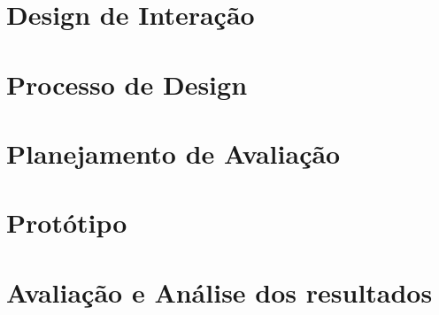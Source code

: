 









\frenchspacing 
\imprimircapa
\imprimirfolhaderosto*





\textual




\part[Design de Interação]{Design de Interação}




\part[Processo de Design]{Processo de Design}



\part[Planejamento de Avaliação]{Planejamento de Avaliação}




\part[Protótipo]{Protótipo}



\part[Avaliação e Análise dos resultados]{Avaliação e Análise dos resultados}



\postextual
 

\printindex




